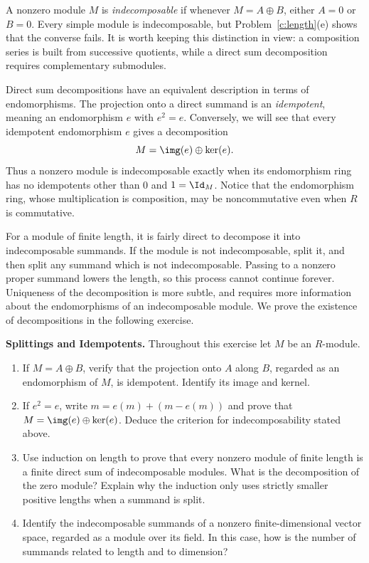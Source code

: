 \documentclass[12pt,reqno]{amsart}
\begin{document}
\hrulefill

A nonzero module $M$ is \emph{indecomposable} if whenever $M=A\oplus B$, either $A=0$ or $B=0$. Every simple module is indecomposable, but Problem~\ref{c:length}(e) shows that the converse fails. It is worth keeping this distinction in view: a composition series is built from successive quotients, while a direct sum decomposition requires complementary submodules.

Direct sum decompositions have an equivalent description in terms of endomorphisms. The projection onto a direct summand is an \emph{idempotent}, meaning an endomorphism $e$ with $e^2=e$. Conversely, we will see that every idempotent endomorphism $e$ gives a decomposition
\[
M=\img(e)\oplus\ker(e).
\]
Thus a nonzero module is indecomposable exactly when its endomorphism ring has no idempotents other than $0$ and $1=\Id_M$. Notice that the endomorphism ring, whose multiplication is composition, may be noncommutative even when $R$ is commutative.

For a module of finite length, it is fairly direct to decompose it into indecomposable summands. If the module is not indecomposable, split it, and then split any summand which is not indecomposable. Passing to a nonzero proper summand lowers the length, so this process cannot continue forever. Uniqueness of the decomposition is more subtle, and requires more information about the endomorphisms of an indecomposable module. We prove the existence of decompositions in the following exercise.

\hrulefill

\begin{problems}
\item\label{c:indecomposable} \textbf{Splittings and Idempotents.} Throughout this exercise let $M$ be an $R$-module.
\begin{enumerate}
\item If $M=A\oplus B$, verify that the projection onto $A$ along $B$, regarded as an endomorphism of $M$, is idempotent. Identify its image and kernel.
\item If $e^2=e$, write $m=e(m)+(m-e(m))$ and prove that $M=\img(e)\oplus\ker(e)$. Deduce the criterion for indecomposability stated above.
\item Use induction on length to prove that every nonzero module of finite length is a finite direct sum of indecomposable modules. What is the decomposition of the zero module? Explain why the induction only uses strictly smaller positive lengths when a summand is split.
\item Identify the indecomposable summands of a nonzero finite-dimensional vector space, regarded as a module over its field. In this case, how is the number of summands related to length and to dimension?
\end{enumerate}
\end{problems}
\end{document}

